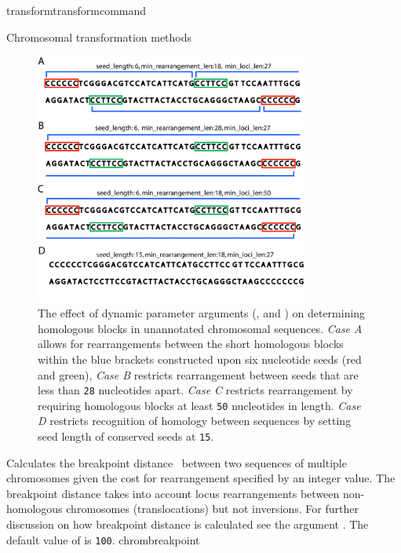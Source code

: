 \begin{command}{transform}{transformcommand}
\begin{arguments}
\begin{argumentgroup}{Chromosomal transformation methods}
\begin{description}
 			\begin{figure} [!htbp]
   		 	\begin{center}
        			\includegraphics[width=0.8\textwidth]{figures/chromfig1.jpg}
    			\end{center}
    			\caption{The effect of dynamic parameter arguments (, 
			and ) on determining homologous blocks in unannotated chromosomal sequences.
			 \emph{Case A} allows for rearrangements between the short homologous blocks within the 				     
			blue brackets constructed upon six nucleotide seeds (red and green), \emph{Case B} 
			restricts rearrangement between seeds that are less than \texttt{28} nucleotides apart.
			 \emph{Case C} restricts rearrangement by requiring homologous blocks at least \texttt{50} nucleotides
			  in length. \emph{Case D} restricts recognition of homology between sequences by setting seed length
			   of conserved seeds at \texttt{15}.}
    		\label{fig:chrom}
		\end{figure}

      		     {Calculates the breakpoint distance~\cite{blanchetteetal1997}
                        between two sequences of multiple chromosomes given the cost for
                        rearrangement specified by an integer value. The breakpoint distance
                        takes into account locus rearrangements between non-homologous
                        chromosomes (translocations) but not inversions. For further discussion on 
                        how breakpoint distance is calculated see the argument .  
                        The default value of  is \texttt{100}.} 
                        {chrombreakpoint}


\end{description}
\end{argumentgroup}
\end{arguments}
\end{command}
